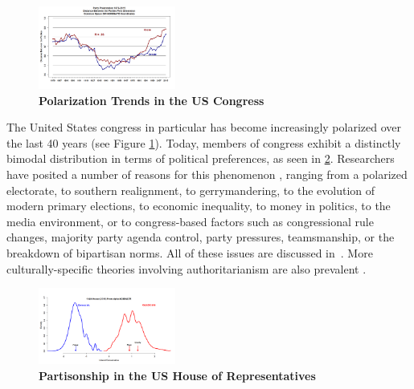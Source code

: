 \begin{figure}[htbp]
\begin{center}
\includegraphics[width=0.4\textwidth]{figs/polar_house_and_senate_46-115_july_11}
\caption{{\bf Polarization Trends in the US Congress}}
\label{fig:uscongress}
\end{center}
\end{figure}




The United States congress in particular has become increasingly polarized over the last 40 years (see Figure \ref{fig:uscongress}).  Today, members of congress exhibit a distinctly bimodal distribution in terms of political preferences, as seen in \ref{fig:partisonship}.  Researchers have posited a number of reasons for this phenomenon \cite{barber2015causes}\cite{poole1984polarization}, ranging from a polarized electorate, to southern realignment, to gerrymandering, to the evolution of modern primary elections, to economic inequality, to money in politics, to the media environment, or to congress-based factors such as congressional rule changes, majority party agenda control, party pressures, teamsmanship, or the breakdown of bipartisan norms.  All of these issues are discussed in~\cite{poole1984polarization}.
More culturally-specific theories involving authoritarianism are also prevalent \cite{hetherington2009authoritarianism}.

\begin{figure}[htbp]
\begin{center}
\includegraphics[width=0.4\textwidth]{figs/alpha_House_114_Histogram_8_January_2016}
\caption{{\bf Partisonship in the US House of Representatives}}
\label{fig:partisonship}
\end{center}
\end{figure}



